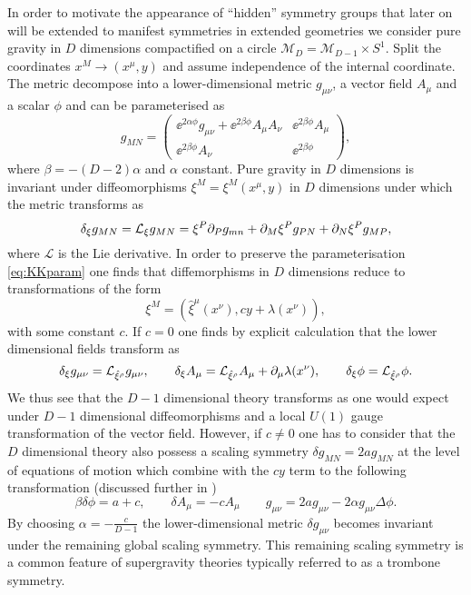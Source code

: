 In order to motivate the appearance of ``hidden'' symmetry groups that later on will be extended to manifest symmetries in extended geometries we consider pure gravity in $D$ dimensions compactified on a circle $\mathcal{M}_D = \mathcal{M}_{D-1}\times S^1$. Split the coordinates $x^M\to (x^\mu,y)$ and assume independence of the internal coordinate. The metric decompose into a lower-dimensional metric $g_{\mu\nu}$, a vector field $A_\mu$ and a scalar $\phi$ and can be parameterised as
\begin{equation}\label{eq:KKparam}
    g_{MN} = \left(\begin{array}{c|c}
                \ee^{2\alpha\phi}g_{\mu\nu}+\ee^{2\beta\phi}A_\mu A_\nu & \ee^{2\beta\phi}A_\mu\\\hline \ee^{2\beta\phi}A_\nu& \ee^{2\beta\phi}
             \end{array}\right),
\end{equation}
where $\beta=-(D-2)\alpha$ and $\alpha$ constant. Pure gravity in $D$ dimensions is invariant under diffeomorphisms $\xi^M=\xi^M(x^\mu,y)$ in $D$ dimensions under which the metric transforms as 
\begin{equation}
    \delta_\xi g_{MN} = \mathcal{L}_\xi g_{MN} = \xi^P\partial_Pg_{mn}+\partial_{M}\xi^Pg_{PN}+\partial_{N}\xi^Pg_{MP},
\end{equation}
where $\mathcal{L}$ is the Lie derivative. In order to preserve the parameterisation \eqref{eq:KKparam} one finds that diffemorphisms in $D$ dimensions reduce to transformations of the form
\begin{equation}
    \xi^M = \left(\hat{\xi}^\mu(x^\nu),cy+\lambda(x^\nu)\right),
\end{equation}
with some constant $c$. If $c=0$ one finds by explicit calculation that the lower dimensional fields transform as 
\begin{equation}
    \delta_\xi g_{\mu\nu} = \mathcal{L}_{\hat{\xi}^\rho}g_{\mu\nu},\qquad \delta_\xi A_\mu = \mathcal{L}_{\hat{\xi}^\rho}A_{\mu}+\partial_\mu\lambda(x^\nu), \qquad \delta_\xi \phi = \mathcal{L}_{\hat{\xi}^\rho}\phi.
\end{equation}
We thus see that the $D-1$ dimensional theory transforms as one would expect under $D-1$ dimensional diffeomorphisms and a local $U(1)$ gauge transformation of the vector field. However, if $c\neq 0$ one has to consider that the $D$ dimensional theory also possess a scaling symmetry $\delta g_{MN}= 2ag_{MN}$ at the level of equations of motion which combine with the $cy$ term to the following transformation (discussed further in \cite{PopeKaluzaKlein})
\begin{equation}
    \beta \delta\phi = a+c,\qquad \delta A_\mu = -cA_\mu\qquad g_{\mu\nu} = 2ag_{\mu\nu}-2\alpha g_{\mu\nu}\Delta\phi.
\end{equation}
By choosing $\alpha = -\frac{c}{D-1}$ the lower-dimensional metric $\delta g_{\mu\nu}$ becomes invariant under the remaining global scaling symmetry. This remaining scaling symmetry is a common feature of supergravity theories typically referred to as a trombone symmetry. 

